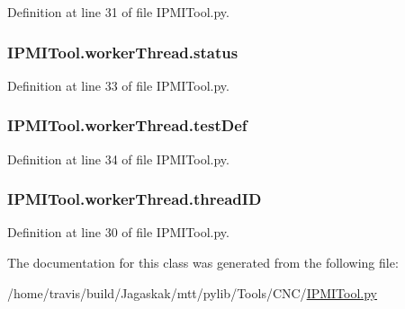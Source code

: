 Definition at line 31 of file I\-P\-M\-I\-Tool.\-py.

\hypertarget{classIPMITool_1_1workerThread_a611bfcde0fa8d328904fde134bde0d87}{
\subsubsection[{status}]{\setlength{\rightskip}{0pt plus 5cm}I\-P\-M\-I\-Tool.\-worker\-Thread.\-status}}\label{classIPMITool_1_1workerThread_a611bfcde0fa8d328904fde134bde0d87}


Definition at line 33 of file I\-P\-M\-I\-Tool.\-py.

\hypertarget{classIPMITool_1_1workerThread_a83638bfbceb196edbfd06990e230cd8e}{
\subsubsection[{test\-Def}]{\setlength{\rightskip}{0pt plus 5cm}I\-P\-M\-I\-Tool.\-worker\-Thread.\-test\-Def}}\label{classIPMITool_1_1workerThread_a83638bfbceb196edbfd06990e230cd8e}


Definition at line 34 of file I\-P\-M\-I\-Tool.\-py.

\hypertarget{classIPMITool_1_1workerThread_ad9622aa9a06ed124fa430c7f57335335}{
\subsubsection[{thread\-I\-D}]{\setlength{\rightskip}{0pt plus 5cm}I\-P\-M\-I\-Tool.\-worker\-Thread.\-thread\-I\-D}}\label{classIPMITool_1_1workerThread_ad9622aa9a06ed124fa430c7f57335335}


Definition at line 30 of file I\-P\-M\-I\-Tool.\-py.



The documentation for this class was generated from the following file\-:\begin{DoxyCompactItemize}
\item 
/home/travis/build/\-Jagaskak/mtt/pylib/\-Tools/\-C\-N\-C/\hyperlink{IPMITool_8py}{I\-P\-M\-I\-Tool.\-py}\end{DoxyCompactItemize}
